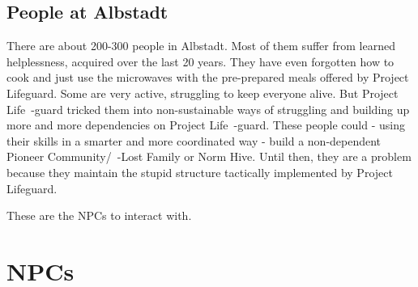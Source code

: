 \subsection{People at Albstadt}

There are about 200-300 people in Albstadt. Most of them suffer from learned helplessness, acquired over the last 20 years. They have even forgotten how to cook and just use the microwaves with the pre-prepared meals offered by Project Lifeguard. Some are very active, struggling to keep everyone alive. But Project Life~-guard tricked them into non-sustainable ways of struggling and building up more and more dependencies on Project Life~-guard. These people could - using their skills in a smarter and more coordinated way - build a non-dependent Pioneer Community/~-Lost Family or Norm Hive. Until then, they are a problem because they maintain the stupid structure tactically implemented by Project Lifeguard.

These are the NPCs to interact with.

\section{NPCs}

\newpage

